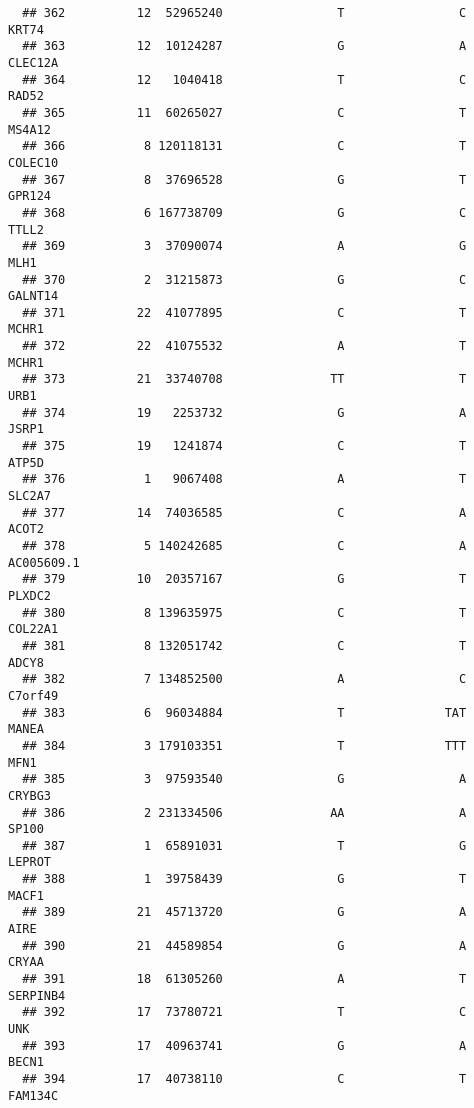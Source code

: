 \documentclass[12pt,twoside]{reedthesis}
\theoremstyle{definition}
\theoremstyle{definition}
\theoremstyle{remark}
\begin{document}
\begin{verbatim}
  ## 362          12  52965240                T                C          KRT74
  ## 363          12  10124287                G                A        CLEC12A
  ## 364          12   1040418                T                C          RAD52
  ## 365          11  60265027                C                T         MS4A12
  ## 366           8 120118131                C                T        COLEC10
  ## 367           8  37696528                G                T         GPR124
  ## 368           6 167738709                G                C          TTLL2
  ## 369           3  37090074                A                G           MLH1
  ## 370           2  31215873                G                C        GALNT14
  ## 371          22  41077895                C                T          MCHR1
  ## 372          22  41075532                A                T          MCHR1
  ## 373          21  33740708               TT                T           URB1
  ## 374          19   2253732                G                A          JSRP1
  ## 375          19   1241874                C                T          ATP5D
  ## 376           1   9067408                A                T         SLC2A7
  ## 377          14  74036585                C                A          ACOT2
  ## 378           5 140242685                C                A     AC005609.1
  ## 379          10  20357167                G                T         PLXDC2
  ## 380           8 139635975                C                T        COL22A1
  ## 381           8 132051742                C                T          ADCY8
  ## 382           7 134852500                A                C        C7orf49
  ## 383           6  96034884                T              TAT          MANEA
  ## 384           3 179103351                T              TTT           MFN1
  ## 385           3  97593540                G                A         CRYBG3
  ## 386           2 231334506               AA                A          SP100
  ## 387           1  65891031                T                G         LEPROT
  ## 388           1  39758439                G                T          MACF1
  ## 389          21  45713720                G                A           AIRE
  ## 390          21  44589854                G                A          CRYAA
  ## 391          18  61305260                A                T       SERPINB4
  ## 392          17  73780721                T                C            UNK
  ## 393          17  40963741                G                A          BECN1
  ## 394          17  40738110                C                T        FAM134C

\end{verbatim}
\end{document}
